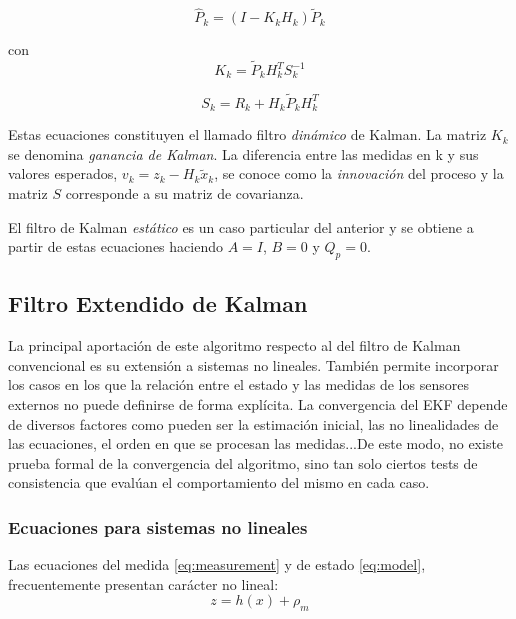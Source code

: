 \begin{equation}\label{eq:P_estimation}
    \hat{P}_{k} = (I-K_{k}H_{k})\tilde{P}_{k}
\end{equation}

con
\begin{equation}\label{eq:K}
    K_{k} = \tilde{P}_{k}H_{k}^{T}S_{k}^{-1}
\end{equation}

\begin{equation}\label{eq:S}
    S_{k} = R_{k}+H_{k}\tilde{P}_{k}H_{k}^{T}
\end{equation}

Estas ecuaciones constituyen el llamado filtro \emph{dinámico} de Kalman.
La matriz $K_{k}$ se denomina \emph{ganancia de Kalman}.
La diferencia entre las medidas en k y sus valores esperados, $v_{k} = z_{k}-H_{k}\tilde{x}_{k}$, se conoce como la \emph{innovación} del proceso y la matriz $S$ corresponde a su matriz de covarianza.

El filtro de Kalman \emph{estático} es un caso particular del anterior y se obtiene a partir de estas ecuaciones haciendo $A = I$, $B = 0$ y $Q_{p} = 0$.

\subsection{Filtro Extendido de Kalman}
La principal aportación de este algoritmo respecto al del filtro de Kalman convencional es su extensión a sistemas no lineales. También permite incorporar los casos en los que la relación entre el estado y las medidas de los sensores externos no puede definirse de forma explícita. La convergencia del EKF depende de diversos factores como pueden ser la estimación inicial, las no linealidades de las ecuaciones, el orden en que se procesan las medidas...De este modo, no existe prueba formal de la convergencia del algoritmo, sino tan solo ciertos tests de consistencia que evalúan el comportamiento del mismo en cada caso.

\subsubsection{Ecuaciones para sistemas no lineales}
Las ecuaciones del medida \ref{eq:measurement} y de estado \ref{eq:model}, frecuentemente presentan carácter no lineal:
\begin{equation}\label{eq:medida_nolineal}
    z = h(x)+\rho_{m}
\end{equation}

